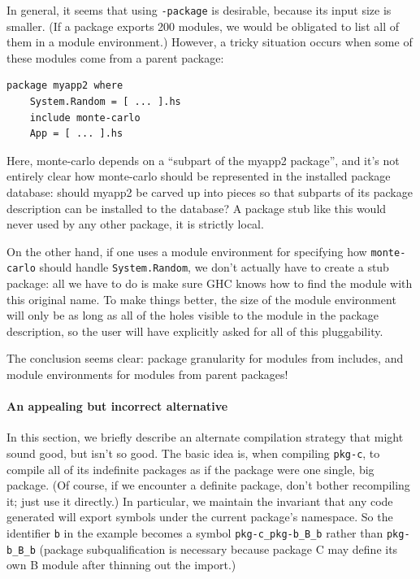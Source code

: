 \documentclass{article}
\begin{document}
In general, it seems that using \verb|-package| is desirable, because its
input size is smaller. (If a package exports 200 modules, we would be obligated
to list all of them in a module environment.)  However, a tricky situation
occurs when some of these modules come from a parent package:

\begin{verbatim}
package myapp2 where
    System.Random = [ ... ].hs
    include monte-carlo
    App = [ ... ].hs
\end{verbatim}

Here, monte-carlo depends on a ``subpart of the myapp2 package'', and it's
not entirely clear how monte-carlo should be represented in the installed
package database: should myapp2 be carved up into pieces so that subparts
of its package description can be installed to the database?  A package
stub like this would never used by any other package, it is strictly local.

On the other hand, if one uses a module environment for specifying how
\verb|monte-carlo| should handle \verb|System.Random|, we don't actually
have to create a stub package: all we have to do is make sure GHC knows
how to find the module with this original name.  To make things better,
the size of the module environment will only be as long as all of the
holes visible to the module in the package description, so the user will
have explicitly asked for all of this pluggability.

The conclusion seems clear: package granularity for modules from includes,
and module environments for modules from parent packages!

\paragraph{An appealing but incorrect alternative}  In this section,
we briefly describe an alternate compilation strategy that might
sound good, but isn't so good.  The basic idea is, when compiling
\verb|pkg-c|, to compile all of its indefinite packages as if the
package were one single, big package.
(Of course, if we encounter a
definite package, don't bother recompiling it; just use it directly.)
In particular, we maintain the invariant that any code generated will
export symbols under the current package's namespace.  So the identifier
\verb|b| in the example becomes a symbol \verb|pkg-c_pkg-b_B_b| rather
than \verb|pkg-b_B_b| (package subqualification is necessary because
package C may define its own B module after thinning out the import.)
\end{document}
